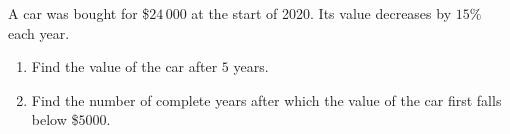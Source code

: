 \documentclass[12pt, twoside]{article}
\begin{document}
\begin{enumerate}[itemsep=0.15cm]
A car was bought for \$$24\,000$ at the start of 2020. Its value
decreases by $15\%$ each year.

\begin{enumerate}[itemsep=0.1cm]
  \item[(c)] Find the value of the car after $5$ years.
  \item[(d)] Find the number of complete years after which the value
  of the car first falls below \$$5000$.
\end{enumerate}


\end{enumerate}
\end{document}
